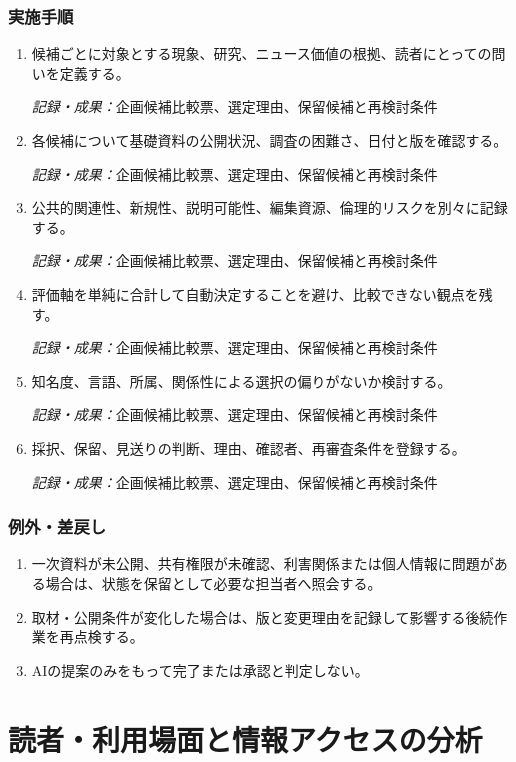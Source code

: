 \documentclass[a4paper,11pt]{article}
\begin{document}
\subsubsection*{実施手順}
\begin{enumerate}[leftmargin=2em,itemsep=0.65em]
\item 候補ごとに対象とする現象、研究、ニュース価値の根拠、読者にとっての問いを定義する。\par\noindent\textit{記録・成果：}企画候補比較票、選定理由、保留候補と再検討条件\nobreak\smallskip
\item 各候補について基礎資料の公開状況、調査の困難さ、日付と版を確認する。\par\noindent\textit{記録・成果：}企画候補比較票、選定理由、保留候補と再検討条件\nobreak\smallskip
\item 公共的関連性、新規性、説明可能性、編集資源、倫理的リスクを別々に記録する。\par\noindent\textit{記録・成果：}企画候補比較票、選定理由、保留候補と再検討条件\nobreak\smallskip
\item 評価軸を単純に合計して自動決定することを避け、比較できない観点を残す。\par\noindent\textit{記録・成果：}企画候補比較票、選定理由、保留候補と再検討条件\nobreak\smallskip
\item 知名度、言語、所属、関係性による選択の偏りがないか検討する。\par\noindent\textit{記録・成果：}企画候補比較票、選定理由、保留候補と再検討条件\nobreak\smallskip
\item 採択、保留、見送りの判断、理由、確認者、再審査条件を登録する。\par\noindent\textit{記録・成果：}企画候補比較票、選定理由、保留候補と再検討条件\nobreak\smallskip
\end{enumerate}
\subsubsection*{例外・差戻し}
\begin{enumerate}[leftmargin=2em,itemsep=0.35em]
\item 一次資料が未公開、共有権限が未確認、利害関係または個人情報に問題がある場合は、状態を保留として必要な担当者へ照会する。
\item 取材・公開条件が変化した場合は、版と変更理由を記録して影響する後続作業を再点検する。
\item AIの提案のみをもって完了または承認と判定しない。
\end{enumerate}
\section{読者・利用場面と情報アクセスの分析}
\end{document}
